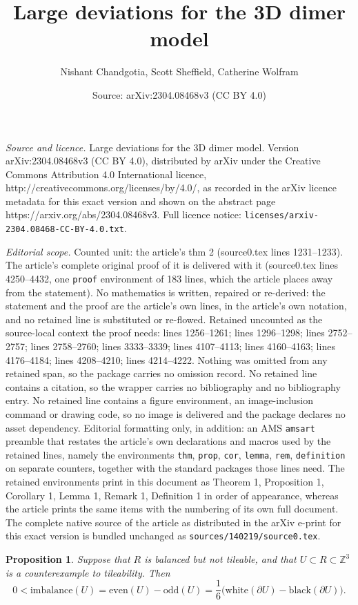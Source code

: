 \documentclass[10pt,a4paper]{amsart}
\title{Large deviations for the 3D dimer model}
\author{Nishant Chandgotia, Scott Sheffield, Catherine Wolfram}
\date{Source: arXiv:2304.08468v3 (CC BY 4.0)}
\newtheorem{prop}{Proposition}
\newcommand{\m}[1]{\mathbb{#1}}
\begin{document}
\maketitle

\noindent\emph{Source and licence.} Large deviations for the 3D dimer model. Version arXiv:2304.08468v3 (CC BY 4.0), distributed by arXiv under the Creative Commons Attribution 4.0 International licence, http://creativecommons.org/licenses/by/4.0/, as recorded in the arXiv licence metadata for this exact version and shown on the abstract page https://arxiv.org/abs/2304.08468v3. Full licence notice: \texttt{licenses/arxiv-2304.08468-CC-BY-4.0.txt}.\par\smallskip

\noindent\textit{Editorial scope.} Counted unit: the article's thm 2 (source0.tex lines 1231--1233). The article's complete original proof of it is delivered with it (source0.tex lines 4250--4432, one \texttt{proof} environment of 183 lines, which the article places away from the statement). No mathematics is written, repaired or re-derived: the statement and the proof are the article's own lines, in the article's own notation, and no retained line is substituted or re-flowed.  Retained uncounted as the source-local context the proof needs: lines 1256--1261; lines 1296--1298; lines 2752--2757; lines 2758--2760; lines 3333--3339; lines 4107--4113; lines 4160--4163; lines 4176--4184; lines 4208--4210; lines 4214--4222.  Nothing was omitted from any retained span, so the package carries no omission record.  No retained line contains a citation, so the wrapper carries no bibliography and no bibliography entry.  No retained line contains a figure environment, an image-inclusion command or drawing code, so no image is delivered and the package declares no asset dependency.  Editorial formatting only, in addition: an AMS \texttt{amsart} preamble that restates the article's own declarations and macros used by the retained lines, namely the environments \texttt{thm}, \texttt{prop}, \texttt{cor}, \texttt{lemma}, \texttt{rem}, \texttt{definition} on separate counters, together with the standard packages those lines need.  The retained environments print in this document as Theorem 1, Proposition 1, Corollary 1, Lemma 1, Remark 1, Definition 1 in order of appearance, whereas the article prints the same items with the numbering of its own full document.  The complete native source of the article as distributed in the arXiv e-print for this exact version is bundled unchanged as \texttt{sources/140219/source0.tex}.
\begin{prop}\label{prop: white black imbalance}
	Suppose that $R$ is balanced but not tileable, and that $U\subset R\subset \m Z^3$ is a counterexample to tileability. Then 
	\begin{equation}\label{eq:imbalance_area}
		0 < \text{imbalance}(U) = \text{even}(U) - \text{odd}(U) = \frac{1}{6} \bigg( \text{white}(\partial U) - \text{black}(\partial U) \bigg).
	\end{equation}
\end{prop}
\end{document}
